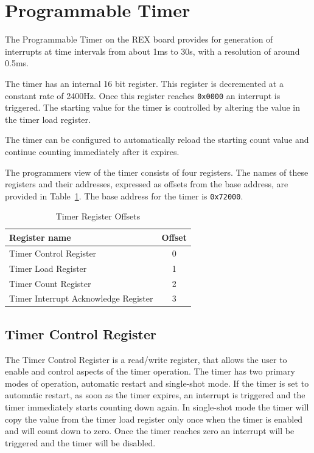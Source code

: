 \documentclass[a4paper,10pt]{article}
\begin{document}
\newpage
\appendix
\section{Programmable Timer}
\label{appen:timer}

The Programmable Timer on the REX board provides for generation of
interrupts at time intervals from about 1ms to 30s, with a resolution
of around 0.5ms.

The timer has an internal 16 bit register. This register is
decremented at a constant rate of 2400Hz. Once this register reaches
\texttt{0x0000} an interrupt is triggered. The starting value for the
timer is controlled by altering the value in the timer load register.

The timer can be configured to automatically reload the starting count
value and continue counting immediately after it expires.

The programmers view of the timer consists of four registers.  The
names of these registers and their addresses, expressed as offsets
from the base address, are provided in
Table~\ref{table:timer_offsets}.  The base address for the timer is
\texttt{0x72000}.

\begin{table}[h]
\begin{center}
\begin{tabular}{|l|c|}
\hline
\textbf{Register name} & \textbf{Offset} \\
\hline
Timer Control Register & 0 \\
\hline
Timer Load Register & 1 \\
\hline
Timer Count Register & 2 \\
\hline
Timer Interrupt Acknowledge Register & 3 \\
\hline
\end{tabular}
\caption{Timer Register Offsets}
\label{table:timer_offsets}
\end{center}
\end{table}


\subsection{Timer Control Register}

The Timer Control Register is a read/write register, that allows the
user to enable and control aspects of the timer operation. The timer
has two primary modes of operation, automatic restart and single-shot
mode. If the timer is set to automatic restart, as soon as the timer
expires, an interrupt is triggered and the timer immediately starts
counting down again. In single-shot mode the timer will copy the value
from the timer load register only once when the timer is enabled and
will count down to zero. Once the timer reaches zero an interrupt will
be triggered and the timer will be disabled.
\end{document}
